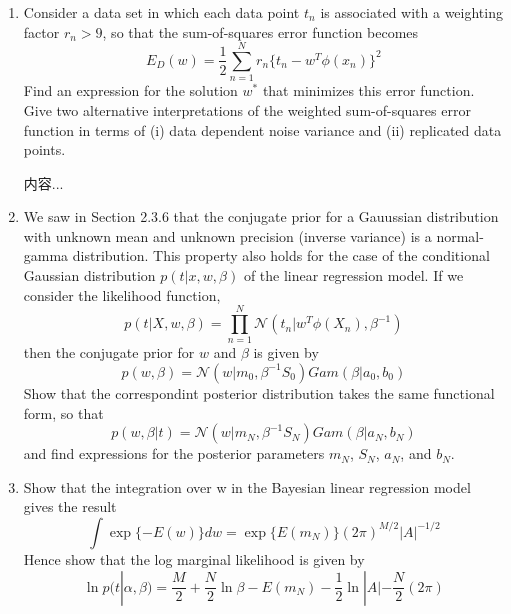 \documentclass[a4paper]{article}
\begin{document}
	\courseheader
	\begin{enumerate}
		\setlength{\itemsep}{3\parskip}
		\item
		Consider a data set in which each data point $t_n$ is associated with a weighting factor $r_n > 9$, so that the sum-of-squares error function becomes\\
		\begin{equation*}
		E_D(w)=\frac{1}{2}\sum_{n=1}^{N}r_n \{t_n-w^T \phi(x_n) \}^2
		\end{equation*}
		Find an expression for the solution $w^*$ that minimizes this error function. Give two alternative interpretations of the weighted sum-of-squares error function in terms of (i) data dependent noise variance and (ii) replicated data points.
		\begin{solution}
			内容...
		\end{solution}
		\item
		We saw in Section 2.3.6 that the conjugate prior for a Gauussian distribution with unknown mean and unknown precision (inverse  variance) is a normal-gamma distribution. This property also holds for the case of the conditional Gaussian distribution $p(t|x,w,\beta)$ of the linear regression model. If we consider the likelihood function,
		\begin{equation*}
			p(t|X,w,\beta)=\prod_{n = 1}^{N}\mathcal{N}(t_n|w^T\phi(X_n),\beta^{-1})
		\end{equation*}
		then the conjugate prior for $w$ and $\beta$ is given by
		\begin{equation*}
			p(w,\beta)=\mathcal{N}(w|m_0,\beta^{-1}S_0)Gam(\beta|a_0,b_0)
		\end{equation*}
		Show that the correspondint posterior distribution takes the same functional form, so that
		\begin{equation*}
			p(w,\beta|t)=\mathcal{N}(w|m_N,\beta^{-1}S_N)Gam(\beta|a_N,b_N)
		\end{equation*}
		and find expressions for the posterior parameters $m_N$, $S_N$, $a_N$, and $b_N$.
		\item
		Show that the integration over w in the Bayesian linear regression model gives the result
		\begin{equation*}
			\int \exp\{-E(w)\}dw=\exp\{E(m_N)\}(2\pi)^{M/2}|A|^{-1/2}
		\end{equation*}
		Hence show that the log marginal likelihood is given by
		\begin{equation*}
			\ln p(t|\alpha,\beta)=\frac{M}{2}+\frac{N}{2}\ln\beta - E(m_N)-\frac{1}{2}\ln|A|-\frac{N}{2}(2\pi)

\end{equation*}
\end{enumerate}
\end{document}
